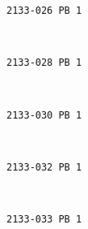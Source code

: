 \documentclass[11pt]{article}
\begin{document}
    \begin{Verbatim}[commandchars=\\\{\}]
2133-026 PB 1

    \end{Verbatim}

    \begin{center}
    \end{center}
    { \hspace*{\fill} \\}
    
    \begin{Verbatim}[commandchars=\\\{\}]
2133-028 PB 1

    \end{Verbatim}

    \begin{center}
    \end{center}
    { \hspace*{\fill} \\}
    
    \begin{Verbatim}[commandchars=\\\{\}]
2133-030 PB 1

    \end{Verbatim}

    \begin{center}
    \end{center}
    { \hspace*{\fill} \\}
    
    \begin{Verbatim}[commandchars=\\\{\}]
2133-032 PB 1

    \end{Verbatim}

    \begin{center}
    \end{center}
    { \hspace*{\fill} \\}
    
    \begin{Verbatim}[commandchars=\\\{\}]
2133-033 PB 1

    \end{Verbatim}
\end{document}
